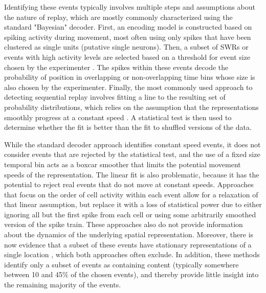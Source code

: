 \documentclass[times, twoside]{zHenriquesLab-StyleBioRxiv}
\begin{document}
Identifying these events typically involves multiple steps and assumptions about the nature of replay, which are mostly commonly characterized using the standard "Bayesian" decoder. First, an encoding model is constructed based on spiking activity during movement, most often using only spikes that have been clustered as single units (putative single neurons). Then, a subset of SWRs or events with high activity levels are selected based on a threshold for event size chosen by the experimenter \cite{FosterReversereplaybehavioural2006, DibaForwardreversehippocampal2007, KarlssonAwakereplayremote2009, StellaHippocampalReactivationRandom2019}. The spikes within these events decode the probability of position in overlapping or non-overlapping time bins whose size is also chosen by the experimenter. Finally, the most commonly used approach to detecting sequential replay involves fitting a line to the resulting set of probability distributions, which relies on the assumption that the representations smoothly progress at a constant speed \cite{FosterReversereplaybehavioural2006, DibaForwardreversehippocampal2007, KarlssonAwakereplayremote2009}. A statistical test is then used to determine whether the fit is better than the fit to shuffled versions of the data.

While the standard decoder approach identifies constant speed events, it does not consider events that are rejected by the statistical test, and the use of a fixed size temporal bin acts as a boxcar smoother that limits the potential movement speeds of the representation. The linear fit is also problematic, because it has the potential to reject real events that do not move at constant speeds. Approaches that focus on the order of cell activity within each event \cite{LeeMemorySequentialExperience2002, GuptaHippocampalReplayNot2010} allow for a relaxation of that linear assumption, but replace it with a loss of statistical power due to either ignoring all but the first spike from each cell or using some arbitrarily smoothed version of the spike train. These approaches also do not provide information about the dynamics of the underlying spatial representation. Moreover, there is now evidence that a subset of these events have stationary representations of a single location \cite{JaiDistincthippocampalcorticalmemory2017, FarooqEmergencepreconfiguredplastic2019}, which both approaches often exclude. In addition, these methods identify only a subset of events as containing content (typically somewhere between 10 and 45\% of the chosen events), and thereby provide little insight into the remaining majority of the events.
\end{document}
